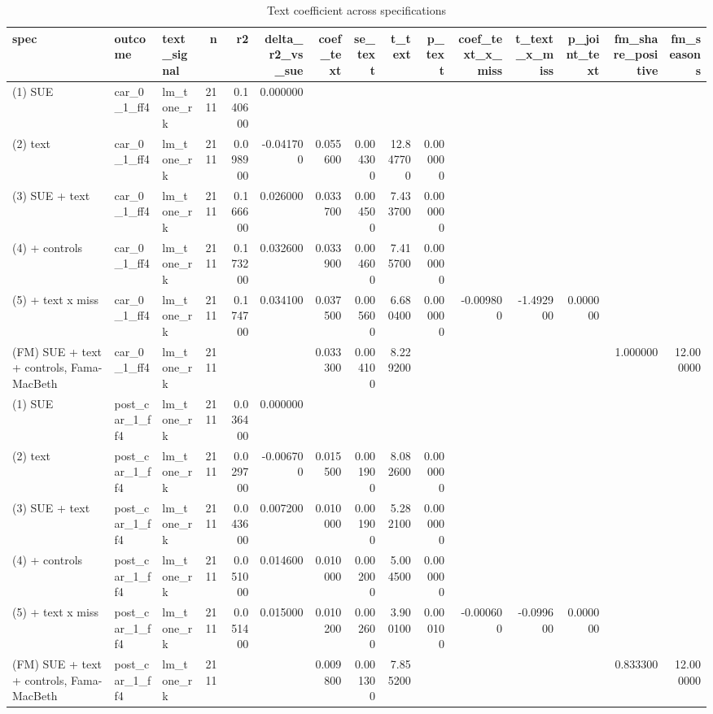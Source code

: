 \begin{table}
\caption{Text coefficient across specifications}
\label{tab:t8_incremental_summary__validation}
\begin{tabular}{lllrrrrrrrrrrrr}
\toprule
spec & outcome & text\_signal & n & r2 & delta\_r2\_vs\_sue & coef\_text & se\_text & t\_text & p\_text & coef\_text\_x\_miss & t\_text\_x\_miss & p\_joint\_text & fm\_share\_positive & fm\_seasons \\
\midrule
(1) SUE & car\_0\_1\_ff4 & lm\_tone\_rk & 2111 & 0.140600 & 0.000000 &  &  &  &  &  &  &  &  &  \\
(2) text & car\_0\_1\_ff4 & lm\_tone\_rk & 2111 & 0.098900 & -0.041700 & 0.055600 & 0.004300 & 12.847700 & 0.000000 &  &  &  &  &  \\
(3) SUE + text & car\_0\_1\_ff4 & lm\_tone\_rk & 2111 & 0.166600 & 0.026000 & 0.033700 & 0.004500 & 7.433700 & 0.000000 &  &  &  &  &  \\
(4) + controls & car\_0\_1\_ff4 & lm\_tone\_rk & 2111 & 0.173200 & 0.032600 & 0.033900 & 0.004600 & 7.415700 & 0.000000 &  &  &  &  &  \\
(5) + text x miss & car\_0\_1\_ff4 & lm\_tone\_rk & 2111 & 0.174700 & 0.034100 & 0.037500 & 0.005600 & 6.680400 & 0.000000 & -0.009800 & -1.492900 & 0.000000 &  &  \\
(FM) SUE + text + controls, Fama-MacBeth & car\_0\_1\_ff4 & lm\_tone\_rk & 2111 &  &  & 0.033300 & 0.004100 & 8.229200 &  &  &  &  & 1.000000 & 12.000000 \\
(1) SUE & post\_car\_1\_ff4 & lm\_tone\_rk & 2111 & 0.036400 & 0.000000 &  &  &  &  &  &  &  &  &  \\
(2) text & post\_car\_1\_ff4 & lm\_tone\_rk & 2111 & 0.029700 & -0.006700 & 0.015500 & 0.001900 & 8.082600 & 0.000000 &  &  &  &  &  \\
(3) SUE + text & post\_car\_1\_ff4 & lm\_tone\_rk & 2111 & 0.043600 & 0.007200 & 0.010000 & 0.001900 & 5.282100 & 0.000000 &  &  &  &  &  \\
(4) + controls & post\_car\_1\_ff4 & lm\_tone\_rk & 2111 & 0.051000 & 0.014600 & 0.010000 & 0.002000 & 5.004500 & 0.000000 &  &  &  &  &  \\
(5) + text x miss & post\_car\_1\_ff4 & lm\_tone\_rk & 2111 & 0.051400 & 0.015000 & 0.010200 & 0.002600 & 3.900100 & 0.000100 & -0.000600 & -0.099600 & 0.000000 &  &  \\
(FM) SUE + text + controls, Fama-MacBeth & post\_car\_1\_ff4 & lm\_tone\_rk & 2111 &  &  & 0.009800 & 0.001300 & 7.855200 &  &  &  &  & 0.833300 & 12.000000 \\

\end{tabular}
\end{table}

